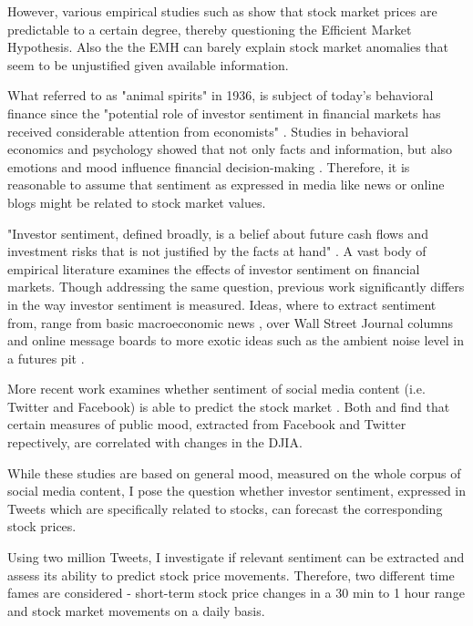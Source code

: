 \documentclass[a4paper,12pt]{article}%
\begin{document}
However, various empirical studies such as \citet{Butler1992, Gallagher2002, Qian2007} show that stock market prices are predictable to a certain degree, thereby questioning the Efficient Market Hypothesis. Also the the EMH can barely explain stock market anomalies that seem to be unjustified given available information. 

What \citeauthor{Keynes1936} referred to as "animal spirits" in 1936, is subject of today's behavioral finance since the "potential role of investor sentiment in financial markets has received considerable attention from economists" \citep{Karabulut2013}. Studies in behavioral economics and psychology showed that not only facts and information, but also emotions and mood influence financial decision-making \citep{Folsom2003, Rick2008}. Therefore, it is reasonable to assume that sentiment as expressed in media like news or online blogs might be related to stock market values.

"Investor sentiment, defined broadly, is a belief about future cash flows and investment risks that is not justified by the facts at hand" \citep{Baker2007}. A vast body of empirical literature examines the effects of investor sentiment on financial markets. Though addressing the same question, previous work significantly  differs in the way investor sentiment is measured. Ideas, where to extract sentiment from, range from basic macroeconomic news \citep{Cutler1989}, over Wall Street Journal columns \citep{Tetlock2007} and online message boards \citep{Antweiler2004} to more exotic ideas such as the ambient noise level in a futures pit \citep{Coval2001}. 

More recent work examines whether sentiment of social media content (i.e. Twitter and Facebook) is able to predict the stock market \citep{Bollen2011, Karabulut2013}. Both \citeauthor{Karabulut2013} and \citeauthor{Bollen2011} find that certain measures of public mood, extracted from Facebook and Twitter repectively, are correlated with changes in the DJIA.

While these studies are based on general mood, measured on the whole corpus of social media content, I pose the question whether investor sentiment, expressed in Tweets which are specifically related to stocks, can forecast the corresponding stock prices.

Using two million Tweets, I investigate if relevant sentiment can be extracted and assess its ability to predict stock price movements. Therefore, two different time fames are considered - short-term stock price changes in a 30 min to 1 hour range and stock market movements on a daily basis. 
\end{document}
